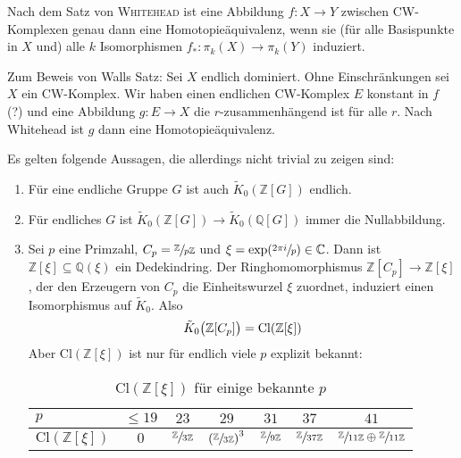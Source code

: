 \begin{bemerkung}
	Nach dem Satz von \textsc{Whitehead} ist eine Abbildung $f \colon X \to Y$ zwischen CW-Komplexen genau dann eine Homotopieäquivalenz, wenn sie (für alle Basispunkte in $X$ und) alle $k$ Isomorphismen $f_* \colon \pi_k(X) \to \pi_k(Y)$ induziert.
	
	Zum Beweis von Walls Satz: Sei $X$ endlich dominiert.
	Ohne Einschränkungen sei $X$ ein CW-Komplex.
	Wir haben einen endlichen CW-Komplex $E$ konstant in $f$ (?) und eine Abbildung $g \colon E \to X$ die $r$-zusammenhängend ist für alle $r$.
	Nach Whitehead ist $g$ dann eine Homotopieäquivalenz.
\end{bemerkung}

\begin{bemerkung}
	Es gelten folgende Aussagen, die allerdings nicht trivial zu zeigen sind:
	\begin{enumerate}[1)]
		\item Für eine endliche Gruppe $G$ ist auch $\tilde{K}_0(\mathbb{Z}[G])$ endlich.
		\item Für endliches $G$ ist $\tilde{K}_0(\mathbb{Z}[G]) \to \tilde{K}_0(\mathbb{Q}[G])$ immer die Nullabbildung.
		\item Sei $p$ eine Primzahl, $C_p = \sfrac{\mathbb{Z}}{p \mathbb{Z}}$ und $\xi = \exp(\sfrac{2 \pi i}{p}) \in \mathbb{C}$.
		Dann ist $\mathbb{Z}[\xi] \subseteq \mathbb{Q}(\xi)$ ein Dedekindring. 
		Der Ringhomomorphismus $\mathbb{Z}[C_p] \to \mathbb{Z}[\xi]$, der den Erzeugern von $C_p$ die Einheitswurzel $\xi$ zuordnet, induziert einen Isomorphismus auf $\tilde{K}_0$. Also
		\[
			\tilde{K}_0 \enbrace[\big]{\mathbb{Z}[C_p]} = \mathrm{Cl} \enbrace*{\mathbb{Z}[\xi]}
		\]
		Aber $\mathrm{Cl}(\mathbb{Z}[\xi])$ ist nur für endlich viele $p$ explizit bekannt:
		\begin{table}[htb!]
			\caption{$\mathrm{Cl}(\mathbb{Z}[\xi])$ für einige bekannte $p$}
			\label{table:bem:cyclo_p}
			\centering
			\begin{tabular}{p{2cm}cccccc}
				\toprule
				$p$ & $\le 19$ & $23$ & $29$ & $31$ & $37$ & $41$\\
				\midrule
				$\mathrm{Cl}(\mathbb{Z}[\xi])$ & $0$ &  $\sfrac{\mathbb{Z}}{3 \mathbb{Z}}$ & $\enbrace*{\sfrac{\mathbb{Z}}{3 \mathbb{Z}}}^3$ & $\sfrac{\mathbb{Z}}{9 \mathbb{Z}}$ & $\sfrac{\mathbb{Z}}{37 \mathbb{Z}}$ &  $\sfrac{\mathbb{Z}}{11 \mathbb{Z}} \oplus \sfrac{\mathbb{Z}}{11 \mathbb{Z}}$\\
				\bottomrule
			\end{tabular}
		\end{table}

	\end{enumerate}
\end{bemerkung}
\newpage

